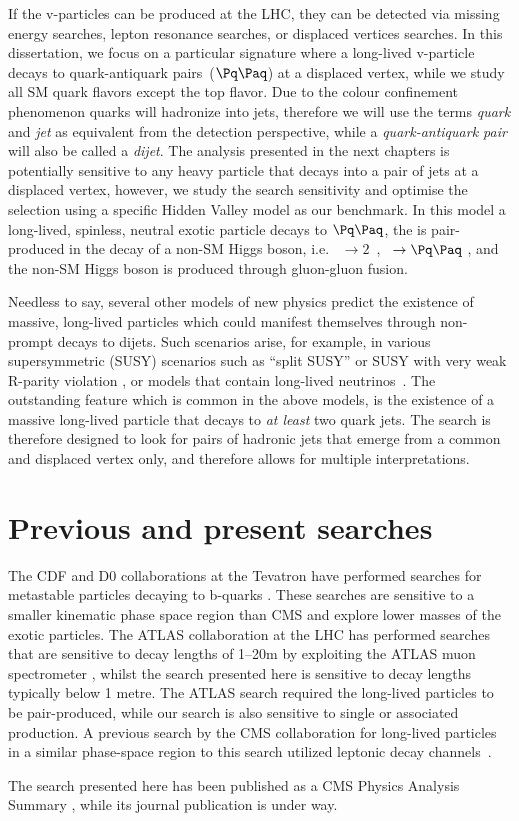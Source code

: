 If the v-particles can be produced at the LHC, they can be detected via missing energy 
searches, lepton resonance searches, or displaced vertices searches. In this dissertation,
we focus on a particular signature where a long-lived v-particle 
decays to quark-antiquark pairs~($\qq$) at a displaced vertex,
 while we study all SM quark flavors except the top flavor. Due to the colour confinement 
phenomenon quarks
will hadronize into jets, therefore we will use the terms {\it quark} and  {\it jet} as 
 equivalent from the detection perspective,
while a {\it quark-antiquark pair} will also be called a {\it dijet}.
The analysis presented in the next chapters is potentially sensitive 
to any heavy particle that decays into a pair of jets 
 at a displaced vertex, however, we study the search sensitivity and optimise the selection
 using a 
specific Hidden Valley
model as our benchmark. In this model a long-lived, spinless, neutral
exotic particle \X decays to $\qq$,
 the \X is pair-produced in the decay of a non-SM Higgs boson, i.e.  \Higgs~$\to
2$\X~, \X~$\to \qq$ \cite{Strassler:2006ri}, and 
the non-SM Higgs boson is produced through gluon-gluon
fusion. 

Needless to say, several other models of new physics predict the existence of massive, 
long-lived particles which could
manifest themselves through non-prompt decays to dijets. Such scenarios arise, for example,
in various supersymmetric (SUSY) scenarios such as ``split SUSY''
\cite{Hewett:2004nw} or SUSY with very weak R-parity violation \cite{Barbier:2004ez}, 
or \Zprime models
that contain long-lived neutrinos~\cite{Basso:2008iv}. 
The outstanding feature which is common in the above models,
is the existence of a massive long-lived particle that decays to {\it at least} two
quark jets. The search is therefore designed to look for pairs of hadronic jets
 that emerge from a common and displaced vertex only, and therefore allows
for multiple interpretations.

\section{Previous and present searches}

The CDF and D0 collaborations at the Tevatron have performed searches for metastable particles decaying to b-quarks
\cite{Aaltonen:2011rja, Abazov:2009ik}.
These searches are sensitive to a smaller kinematic phase space region than CMS and explore
lower masses of the exotic particles. The ATLAS collaboration
at the LHC has performed searches that are sensitive to decay lengths of 1--20\unit{m} by exploiting the ATLAS muon
 spectrometer \cite{ATLAS:2012av}, whilst the search presented here is sensitive to decay lengths 
typically below 1 metre.
 The ATLAS search required the long-lived particles to be pair-produced,
while our search
is also sensitive to single or associated production.
A previous search by the CMS collaboration for long-lived particles in a similar phase-space region
to this search utilized leptonic decay channels~\cite{Chatrchyan:2012jna}.

The search presented here has been published as a CMS Physics Analysis Summary 
\cite{CMS-PAS-EXO-12-038}, while its journal publication is under way.
